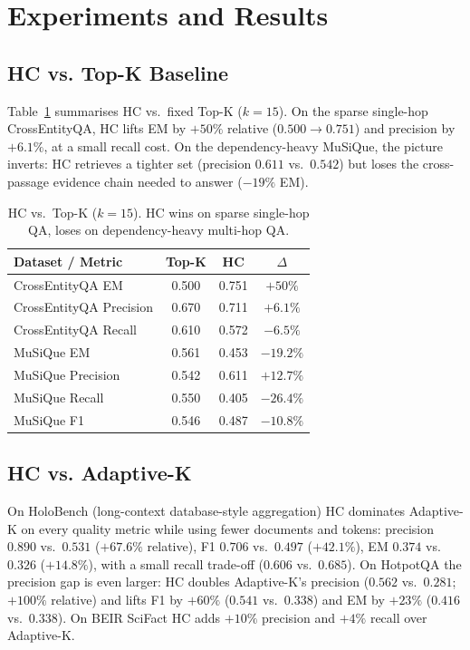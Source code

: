 \documentclass[letterpaper]{article}
\newcommand{\CEqaEMHC}{0.751}
\newcommand{\CEqaEMTopK}{0.500}
\newcommand{\CEqaPrecHC}{0.711}
\newcommand{\CEqaPrecTopK}{0.670}
\newcommand{\CEqaRecHC}{0.572}
\newcommand{\CEqaRecTopK}{0.610}
\newcommand{\MusEMHC}{0.453}
\newcommand{\MusEMTopK}{0.561}
\newcommand{\MusPrecHC}{0.611}
\newcommand{\MusPrecTopK}{0.542}
\newcommand{\MusRecHC}{0.405}
\newcommand{\MusRecTopK}{0.550}
\newcommand{\MusFOneHC}{0.487}
\newcommand{\MusFOneTopK}{0.546}
\newcommand{\HotEMHC}{0.416}
\newcommand{\HotEMAdaK}{0.338}
\newcommand{\HotPrecHC}{0.562}
\newcommand{\HotPrecAdaK}{0.281}
\newcommand{\HotFOneHC}{0.541}
\newcommand{\HotFOneAdaK}{0.338}
\newcommand{\HolEMHC}{0.374}
\newcommand{\HolEMAdaK}{0.326}
\newcommand{\HolPrecHC}{0.890}
\newcommand{\HolPrecAdaK}{0.531}
\newcommand{\HolRecHC}{0.606}
\newcommand{\HolRecAdaK}{0.685}
\newcommand{\HolFOneHC}{0.706}
\newcommand{\HolFOneAdaK}{0.497}
\begin{document}
\section{Experiments and Results}

\subsection{HC vs. Top-K Baseline}
\label{sec:topk}
Table~\ref{tab:topk} summarises HC vs.\ fixed Top-K ($k=15$).
On the sparse single-hop CrossEntityQA, HC lifts EM by
$+50\%$ relative ($\CEqaEMTopK \rightarrow \CEqaEMHC$) and precision
by $+6.1\%$, at a small recall cost. On the dependency-heavy
MuSiQue, the picture inverts: HC retrieves a tighter set
(precision $\MusPrecHC$ vs.\ $\MusPrecTopK$) but loses the
cross-passage evidence chain needed to answer ($-19\%$ EM).

\begin{table}[t]
\centering
\small
\begin{tabular}{lccc}
\hline
Dataset / Metric & Top-K & HC & $\Delta$ \\
\hline
CrossEntityQA EM        & \CEqaEMTopK   & \CEqaEMHC   & $+50\%$ \\
CrossEntityQA Precision & \CEqaPrecTopK & \CEqaPrecHC & $+6.1\%$ \\
CrossEntityQA Recall    & \CEqaRecTopK  & \CEqaRecHC  & $-6.5\%$ \\
\hline
MuSiQue EM              & \MusEMTopK    & \MusEMHC    & $-19.2\%$ \\
MuSiQue Precision       & \MusPrecTopK  & \MusPrecHC  & $+12.7\%$ \\
MuSiQue Recall          & \MusRecTopK   & \MusRecHC   & $-26.4\%$ \\
MuSiQue F1              & \MusFOneTopK  & \MusFOneHC  & $-10.8\%$ \\
\hline
\end{tabular}
\caption{HC vs.\ Top-K ($k=15$). HC wins on sparse single-hop QA,
loses on dependency-heavy multi-hop QA.}
\label{tab:topk}
\end{table}

\subsection{HC vs. Adaptive-K}
\label{sec:adak}
On HoloBench (long-context database-style aggregation) HC dominates
Adaptive-K on every quality metric while using fewer documents and
tokens: precision $\HolPrecHC$ vs.\ $\HolPrecAdaK$ ($+67.6\%$
relative), F1 $\HolFOneHC$ vs.\ $\HolFOneAdaK$ ($+42.1\%$), EM
$\HolEMHC$ vs.\ $\HolEMAdaK$ ($+14.8\%$), with a small recall
trade-off ($\HolRecHC$ vs.\ $\HolRecAdaK$). On HotpotQA the precision
gap is even larger: HC doubles Adaptive-K's precision ($\HotPrecHC$
vs.\ $\HotPrecAdaK$; $+100\%$ relative) and lifts F1 by $+60\%$
($\HotFOneHC$ vs.\ $\HotFOneAdaK$) and EM by $+23\%$ ($\HotEMHC$
vs.\ $\HotEMAdaK$). On BEIR SciFact HC adds $+10\%$ precision and
$+4\%$ recall over Adaptive-K.
\end{document}
